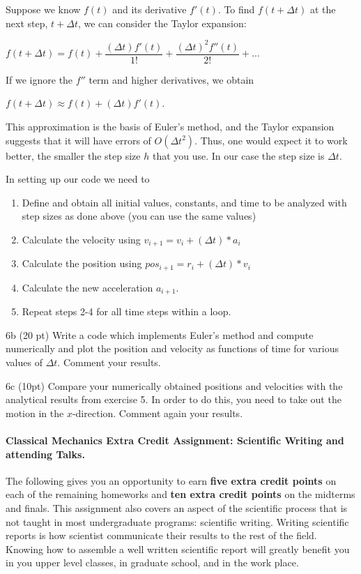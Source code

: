 \documentclass[%
oneside,                 %
final,                   %
10pt]{article}
\begin{document}
Suppose we know $f(t)$ and its derivative $f'(t)$. To find $f(t+\Delta t)$ at the next step, $t+\Delta t$,
we can consider the Taylor expansion:

$f(t+\Delta t) = f(t) + \dfrac{(\Delta t)f'(t)}{1!} + \dfrac{(\Delta t)^2f''(t)}{2!} + ...$

If we ignore the $f''$ term and higher derivatives, we obtain

$f(t+\Delta t) \approx f(t) + (\Delta t)f'(t)$.

This approximation is the basis of Euler's method, and the Taylor
expansion suggests that it will have errors of $O(\Delta t^2)$.  Thus, one
would expect it to work better, the smaller the step size $h$ that you
use. In our case the step size is $\Delta t$. 

In setting up our code we need to

\begin{enumerate}
 \item Define and obtain all initial values, constants, and time to be analyzed with step sizes as done above (you can use the same values)

 \item Calculate the velocity using $v_{i+1} = v_{i} + (\Delta t)*a_{i}$

 \item Calculate the position using $pos_{i+1} = r_{i} + (\Delta t)*v_{i}$

 \item Calculate the new acceleration $a_{i+1}$.

 \item Repeat steps 2-4 for all time steps within a loop.

\end{enumerate}

\noindent
\item 6b (20 pt) Write a code which implements Euler's method and compute numerically and plot the position and velocity as functions of time for various values of $\Delta t$. Comment your results.


\item 6c (10pt) Compare your numerically obtained positions and velocities with the analytical results from exercise 5. In order to do this, you need to take out the motion in the $x$-direction. Comment again your results.

\paragraph{Classical Mechanics Extra Credit Assignment: Scientific Writing and attending Talks.}
The following gives you an opportunity to earn \textbf{five extra credit
points} on each of the remaining homeworks and \textbf{ten extra credit points}
on the midterms and finals.  This assignment also covers an aspect of
the scientific process that is not taught in most undergraduate
programs: scientific writing.  Writing scientific reports is how
scientist communicate their results to the rest of the field.  Knowing
how to assemble a well written scientific report will greatly benefit
you in you upper level classes, in graduate school, and in the work
place.
\end{document}
